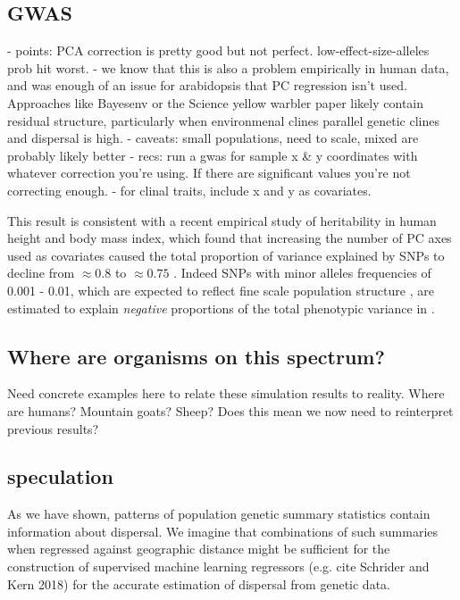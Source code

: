 \documentclass[10pt,twoside,lineno]{gsajnl}
\begin{document}
\subsection{GWAS}

- points: PCA correction is pretty good but not perfect. low-effect-size-alleles prob hit worst. 
- we know that this is also a problem empirically in human data, and was enough of an issue for arabidopsis that PC regression isn't used. Approaches like Bayesenv or the Science yellow warbler paper likely contain residual structure, particularly when environmenal clines parallel genetic clines and dispersal is high. 
- caveats: small populations, need to scale, mixed are probably likely better
- recs: run a gwas for sample x & y coordinates with whatever correction you're using. If there are significant values you're not correcting enough.
- for clinal traits, include x and y as covariates. 

This result is consistent with a recent empirical study of heritability in human height and body mass index, which found that increasing the number of PC axes used as covariates caused the total proportion of variance explained by SNPs to decline from $\approx0.8$ to $\approx0.75$ \citep{Wainschtein2019}. Indeed SNPs with minor alleles frequencies of 0.001 - 0.01, which are expected to reflect fine scale population structure \citep{Mathieson2012,Novembre2009}, are estimated to explain \textit{negative} proportions of the total phenotypic variance in \citep{Wainschtein2019}.

\subsection{Where are organisms on this spectrum?}
Need concrete examples here to relate these simulation results to reality. Where are humans? Mountain goats? Sheep? Does this mean we now need to reinterpret previous results? 

\subsection{speculation}
As we have shown, patterns of population genetic summary statistics contain information about dispersal. We imagine that combinations of such summaries when regressed against geographic distance might be sufficient for the construction of supervised machine learning regressors (e.g. cite Schrider and Kern 2018) for the accurate estimation of dispersal from genetic data. 
\end{document}
